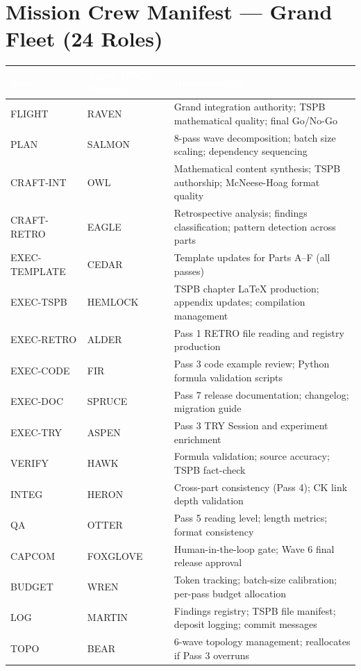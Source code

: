 \documentclass[11pt,letterpaper]{article}
\newcommand{\tableheader}[1]{\textbf{\sffamily\textcolor{white}{#1}}}
\begin{document}
\section{Mission Crew Manifest --- Grand Fleet (24 Roles)}

\begin{center}
\begin{tabularx}{\textwidth}{L{2.5cm}L{3cm}X}
\toprule
{}
\tableheader{Role} & \tableheader{Agent (PNW Naming)} & \tableheader{Responsibility} \\
\midrule
FLIGHT & RAVEN & Grand integration authority; TSPB mathematical quality; final Go/No-Go \\
PLAN & SALMON & 8-pass wave decomposition; batch size scaling; dependency sequencing \\
CRAFT-INT & OWL & Mathematical content synthesis; TSPB authorship; McNeese-Hoag format quality \\
CRAFT-RETRO & EAGLE & Retrospective analysis; findings classification; pattern detection across parts \\
EXEC-TEMPLATE & CEDAR & Template updates for Parts A--F (all passes) \\
EXEC-TSPB & HEMLOCK & TSPB chapter LaTeX production; appendix updates; compilation management \\
EXEC-RETRO & ALDER & Pass 1 RETRO file reading and registry production \\
EXEC-CODE & FIR & Pass 3 code example review; Python formula validation scripts \\
EXEC-DOC & SPRUCE & Pass 7 release documentation; changelog; migration guide \\
EXEC-TRY & ASPEN & Pass 3 TRY Session and experiment enrichment \\
VERIFY & HAWK & Formula validation; source accuracy; TSPB fact-check \\
INTEG & HERON & Cross-part consistency (Pass 4); CK link depth validation \\
QA & OTTER & Pass 5 reading level; length metrics; format consistency \\
CAPCOM & FOXGLOVE & Human-in-the-loop gate; Wave 6 final release approval \\
BUDGET & WREN & Token tracking; batch-size calibration; per-pass budget allocation \\
LOG & MARTIN & Findings registry; TSPB file manifest; deposit logging; commit messages \\
TOPO & BEAR & 6-wave topology management; reallocates if Pass 3 overruns \\

\end{tabularx}
\end{center}
\end{document}
